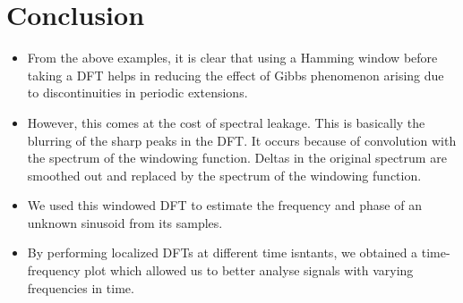 \documentclass[11pt, a4paper]{article}
\begin{document}
\section{Conclusion}
\begin{itemize}
    \item
      From the above examples, it is clear that using a Hamming window
      before taking a DFT helps in reducing the effect of Gibbs phenomenon
      arising due to discontinuities in periodic extensions.
    \item
      However, this comes at the cost of spectral leakage. This is basically
      the blurring of the sharp peaks in the DFT. It occurs because of
      convolution with the spectrum of the windowing function. Deltas in the
      original spectrum are smoothed out and replaced by the spectrum of the
      windowing function.
    \item
      We used this windowed DFT to estimate the frequency and phase of an
      unknown sinusoid from its samples.
    \item
      By performing localized DFTs at different time isntants, we obtained a
      time-frequency plot which allowed us to better analyse signals with
      varying frequencies in time.
    \end{itemize}
    
\end{document}
